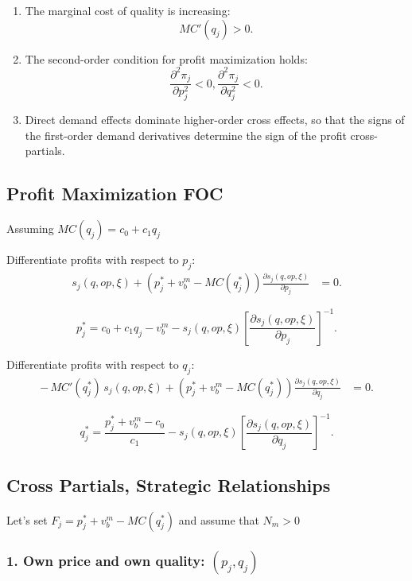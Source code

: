 \documentclass[12pt]{article}
\begin{document}
\begin{enumerate}

\item The marginal cost of quality is increasing:
\[
MC'(q_j) > 0.
\]

\item The second-order condition for profit maximization holds:
\[
\frac{\partial^2 \pi_j}{\partial p_j^2} < 0,\frac{\partial^2 \pi_j}{\partial q_j^2} < 0.
\]

\item Direct demand effects dominate higher-order cross effects, so that the signs
of the first-order demand derivatives determine the sign of the profit cross-partials.
\end{enumerate}

\subsection{Profit Maximization FOC}
Assuming $MC(q_j)=c_0+c_1 q_j$

Differentiate profits with respect to $p_j$:
\begin{align}
s_j(q,op,\xi)
+
\left(p_j^*+v_b^m-MC(q_j^*)\right)\frac{\partial s_j(q,op,\xi)}{\partial p_j}
&=0.
\end{align}

\begin{equation}
p_j^*
=
c_0+c_1 q_j-v_b^m
-
s_j(q,op,\xi)
\left[\frac{\partial s_j(q,op,\xi)}{\partial p_j}\right]^{-1}.
\end{equation}

Differentiate profits with respect to $q_j$:
\begin{align}
-\,MC'(q_j^*)\,s_j(q,op,\xi)
+
\left(p_j^*+v_b^m-MC(q_j^*)\right)\frac{\partial s_j(q,op,\xi)}{\partial q_j}
&=0.
\end{align}


\begin{equation}
q_j^*
=
\frac{p_j^*+v_b^m-c_0}{c_1}
-
s_j(q,op,\xi)
\left[\frac{\partial s_j(q,op,\xi)}{\partial q_j}\right]^{-1}.
\end{equation}
\subsection{Cross Partials, Strategic Relationships}
Let's set $F_j = p_j^*+v_b^m-MC(q_j^*)$ and assume that $N_m >0$
\subsubsection*{1. Own price and own quality: $(p_j,q_j)$}
\end{document}
